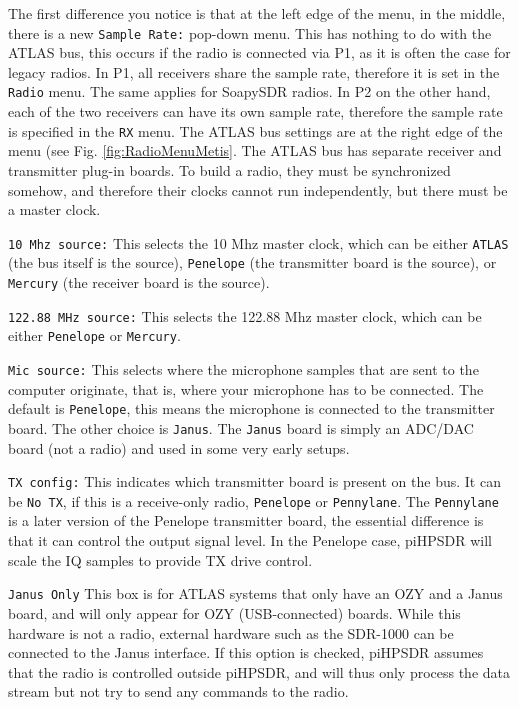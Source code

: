 \documentclass[12pt]{book}
\def\rett#1{\texttt{\color{red}#1}}
\def\bltt#1{\texttt{\color{blue}#1}}
\begin{document}
The first difference you notice is that at the left edge of the menu, in the middle,
there is a new \rett{Sample Rate:} pop-down menu. This has nothing to do with the
ATLAS bus, this occurs if the radio is connected via P1, as it is often the case for
legacy radios. In P1, all receivers share the sample rate, therefore it is set in the
\bltt{Radio} menu. The same applies for SoapySDR radios. In P2 on the other hand, each
of the two receivers can have its own sample rate, therefore the sample rate is specified
in the \bltt{RX} menu. The ATLAS bus settings are at the right edge of the menu (see Fig.
\ref{fig:RadioMenuMetis}. The ATLAS bus has separate receiver and transmitter plug-in boards.
To build a radio, they must be synchronized somehow, and therefore their clocks cannot run
independently, but there must be a master clock.

\rett{10 Mhz source:} This selects the 10 Mhz master clock, which can be either \texttt{ATLAS}
(the bus itself is the source), \texttt{Penelope} (the transmitter board is the source),
or \texttt{Mercury} (the receiver board is the source).

\rett{122.88 MHz source:} This selects the 122.88 Mhz master clock, which can be either
\texttt{Penelope} or \texttt{Mercury}.

\rett{Mic source:} This selects where the microphone samples that are sent to the computer
originate, that is, where your microphone has to be connected. The default is
\texttt{Penelope}, this means the microphone is connected to the transmitter board. The
other choice is \texttt{Janus}. The \texttt{Janus} board is simply an ADC/DAC board (not
a radio) and used in some very early setups.

\rett{TX config:} This indicates which transmitter board is present on the bus. It can
be \texttt{No TX}, if this is a receive-only radio, \texttt{Penelope} or \texttt{Pennylane}.
The \texttt{Pennylane} is a later version of the Penelope transmitter board, the essential
difference is that it can control the output signal level. In the Penelope case,
piHPSDR will scale the IQ samples to provide TX drive control.

\rett{Janus Only} This box is for ATLAS systems that only have an OZY and a Janus board,
and will only appear for OZY (USB-connected) boards. While this hardware is not a radio,
external hardware such as the SDR-1000 can be connected to the Janus interface. If this
option is checked, piHPSDR assumes that the radio is controlled outside piHPSDR, and
will thus only process the data stream but not try to send any commands to the radio.
\end{document}
